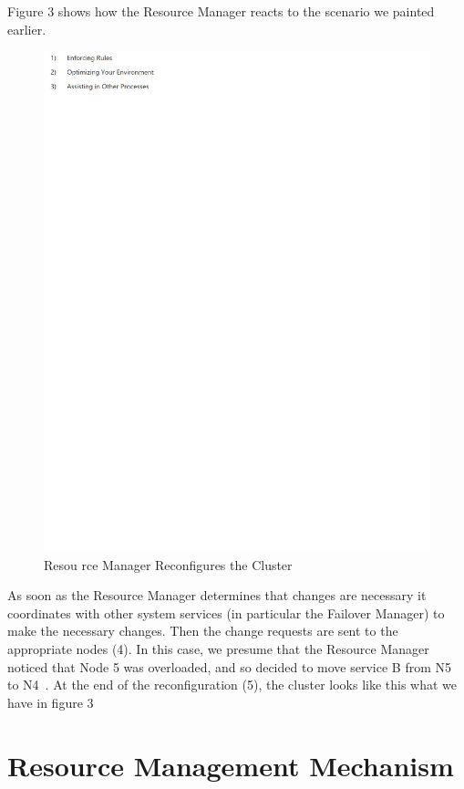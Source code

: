 Figure 3 shows how the Resource Manager reacts to the scenario we
painted earlier.

\begin{figure}[!ht]
  \centering\includegraphics[width=\columnwidth]{images/fig3.pdf}
  \caption{Resou
  rce Manager Reconfigures the Cluster~\cite{hid-sp18-501-fig2and3}}
\label{f:architecture}
\end{figure}

As soon as the Resource Manager determines that changes are necessary
it coordinates with other system services (in particular the Failover
Manager) to make the necessary changes. Then the change requests are
sent to the appropriate nodes (4). In this case, we presume that the
Resource Manager noticed that Node 5 was overloaded, and so decided to
move service B from N5 to N4~\cite{hid-sp18-501-fig2and3}. 
At the end of the reconfiguration (5),
the cluster looks like this what we have in figure 3

\section{Resource Management Mechanism}


